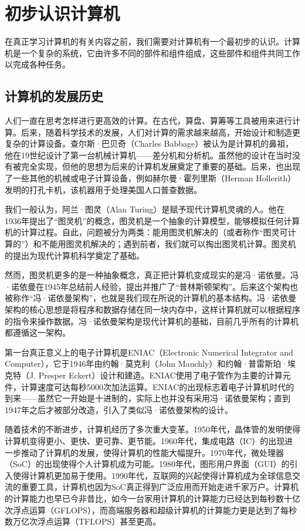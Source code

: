 \documentclass[../main.tex]{subfiles}
\begin{document}
\chapter{初步认识计算机}

在真正学习计算机的有关内容之前，我们需要对计算机有一个最初步的认识。计算机是一个复杂的系统，它由许多不同的部件和组件组成，这些部件和组件共同工作以完成各种任务。

\section{计算机的发展历史}

人们一直在思考怎样进行更高效的计算。在古代，算盘、算筹等工具被用来进行计算。后来，随着科学技术的发展，人们对计算的需求越来越高，开始设计和制造更复杂的计算设备。查尔斯·巴贝奇（Charles Babbage）被认为是计算机的鼻祖，他在19世纪设计了第一台机械计算机——差分机和分析机。虽然他的设计在当时没有被完全实现，但他的思想为后来的计算机发展奠定了重要的基础。后来，也出现了一些其他的机械或电子计算设备，例如赫尔曼·霍列里斯（Herman Hollerith）发明的打孔卡机，该机器用于处理美国人口普查数据。

我们一般认为，阿兰·图灵（Alan Turing）是赋予现代计算机灵魂的人。他在1936年提出了“图灵机”的概念，图灵机是一个抽象的计算模型，能够模拟任何计算机的计算过程。自此，问题被分为两类：能用图灵机解决的（或者称作“图灵可计算的”）和不能用图灵机解决的；遇到前者，我们就可以掏出图灵机计算。图灵机的提出为现代计算机科学奠定了基础。

然而，图灵机更多的是一种抽象概念，真正把计算机变成现实的是冯·诺依曼。冯·诺依曼在1945年总结前人经验，提出并推广了“普林斯顿架构”。后来这个架构也被称作“冯·诺依曼架构”，也就是我们现在所说的计算机的基本结构。冯·诺依曼架构的核心思想是将程序和数据存储在同一块内存中，这样计算机就可以根据程序的指令来操作数据。冯·诺依曼架构是现代计算机的基础，目前几乎所有的计算机都遵循这一架构。

第一台真正意义上的电子计算机是ENIAC（Electronic Numerical Integrator and Computer），它于1946年由约翰·莫克利（John Mauchly）和约翰·普雷斯珀·埃克特（J. Presper Eckert）设计和建造。ENIAC使用了电子管作为主要的计算元件，计算速度可达每秒5000次加法运算。ENIAC的出现标志着电子计算机时代的到来——虽然它一开始是十进制的，实际上也并没有采用冯·诺依曼架构；直到1947年之后才被部分改造，引入了类似冯·诺依曼架构的设计。

随着技术的不断进步，计算机经历了多次重大变革。1950年代，晶体管的发明使得计算机变得更小、更快、更可靠、更节能。1960年代，集成电路（IC）的出现进一步推动了计算机的发展，使得计算机的性能大幅提升。1970年代，微处理器（SoC）的出现使得个人计算机成为可能。1980年代，图形用户界面（GUI）的引入使得计算机更加易于使用。1990年代，互联网的兴起使得计算机成为全球信息交流的重要工具，计算机也因为SoC真正得到广泛应用而开始走进千家万户。计算机的计算能力也早已今非昔比，如今一台家用计算机的计算能力已经达到每秒数十亿次浮点运算（GFLOPS），而高端服务器和超级计算机的计算能力更是达到了每秒数万亿次浮点运算（TFLOPS）甚至更高。
\end{document}
